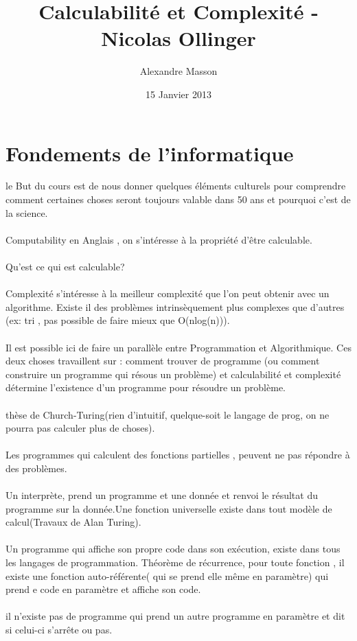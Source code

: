 \documentclass{article}
\title{Calculabilité et Complexité - Nicolas Ollinger}
\author{Alexandre Masson}
\date{15 Janvier 2013}
\begin{document}
\maketitle
\newpage
\tableofcontents
\newpage
\section{Fondements de l'informatique}le But du cours est de nous donner quelques éléments culturels pour comprendre comment certaines choses seront toujours valable dans 50 ans et pourquoi c'est de la science.\\\\Computability en Anglais , on s'intéresse à la propriété d’être calculable.\\\\Qu'est ce qui est calculable?\\\\ Complexité s’intéresse à la meilleur complexité que l'on peut obtenir avec un algorithme. Existe il des problèmes intrinsèquement plus complexes que d'autres (ex: tri , pas possible de faire mieux que O(nlog(n))).\\\\Il est possible ici de faire un parallèle entre Programmation et Algorithmique. Ces deux choses travaillent sur : comment trouver de programme (ou comment construire un programme qui résous un problème) et calculabilité et complexité détermine l'existence d'un programme pour résoudre un problème.\\\\thèse de Church-Turing(rien d'intuitif, quelque-soit le langage de prog, on ne pourra pas calculer plus de choses).\\\\Les programmes qui calculent des fonctions partielles , peuvent ne pas répondre à des problèmes.\\\\Un interprète, prend un programme et une donnée et renvoi le résultat du programme sur la donnée.Une fonction universelle existe dans tout modèle de calcul(Travaux de Alan Turing).\\\\Un programme qui affiche son propre code dans son exécution, existe dans tous les langages de programmation. Théorème de récurrence, pour toute fonction , il existe une fonction auto-référente( qui se prend elle même en paramètre) qui prend e code en paramètre et affiche son code. \\\\ il n'existe pas de programme qui prend un autre programme en paramètre et dit si celui-ci s’arrête  ou pas.\newpage
\end{document}
